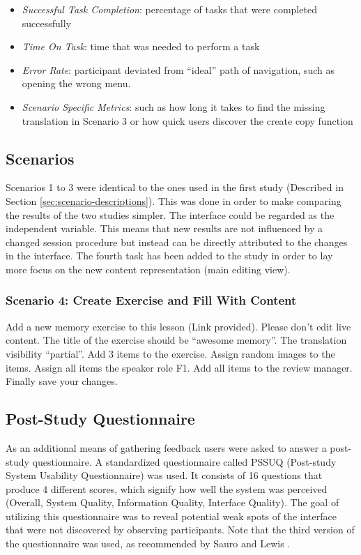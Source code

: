 \begin{itemize}
 \item{\emph{Successful Task Completion}: percentage of tasks that were completed successfully}
 \item{\emph{Time On Task}: time that was needed to perform a task}
 \item{\emph{Error Rate}: participant deviated from “ideal” path of navigation, such as opening the wrong menu.}
 \item{\emph{Scenario Specific Metrics}: such as how long it takes to find the missing translation in Scenario 3 or how quick users discover the create copy function}
\end{itemize}

\subsection{Scenarios}
Scenarios 1 to 3 were identical to the ones used in the first study (Described in Section \ref{sec:scenario-descriptions}). This was done in order to make comparing the results of the two studies simpler. The interface could be regarded as the independent variable. This means that new results are not influenced by a changed session procedure but instead can be directly attributed to the changes in the interface. The fourth task has been added to the study in order to lay more focus on the new content representation (main editing view).

\subsubsection{Scenario 4: Create Exercise and Fill With Content} Add a new memory exercise to this lesson (Link provided). Please don’t edit live content. The title of the exercise should be “awesome memory”. The translation visibility “partial”. Add 3 items to the exercise. Assign random images to the items. Assign all items the speaker role F1. Add all items to the review manager. Finally save your changes.

\subsection{Post-Study Questionnaire}
As an additional means of gathering feedback users were asked to answer a post-study questionnaire. A standardized questionnaire called PSSUQ (Post-study System Usability Questionnaire) was used. It consists of 16 questions that produce 4 different scores, which signify how well the system was perceived (Overall, System Quality, Information Quality, Interface Quality). The goal of utilizing this questionnaire was to reveal potential weak spots of the interface that were not discovered by observing participants. Note that the third version of the questionnaire was used, as recommended by Sauro and Lewis \cite{sauro_quantifying_2012}.

